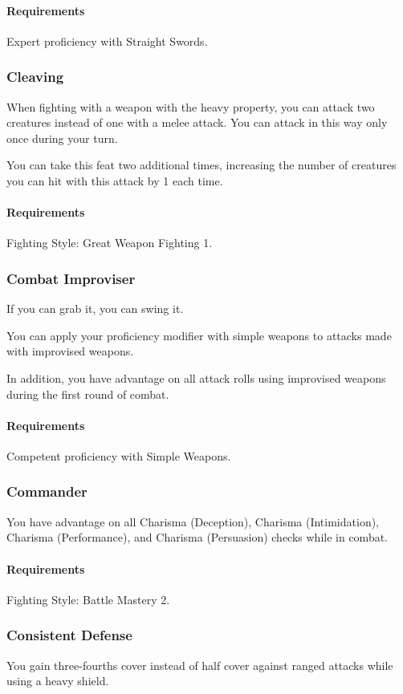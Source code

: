     \paragraph{Requirements} Expert proficiency with Straight Swords.
\subsubsection{Cleaving} \label{feat::cleaving}
    When fighting with a weapon with the heavy property, you can attack two creatures instead of one with a melee attack.
    You can attack in this way only once during your turn.

    You can take this feat two additional times, increasing the number of creatures you can hit with this attack by 1 each time.
    \paragraph{Requirements} Fighting Style: Great Weapon Fighting 1.
\subsubsection{Combat Improviser} \label{feat::combatimproviser}
    If you can grab it, you can swing it.

    You can apply your proficiency modifier with simple weapons to attacks made with improvised weapons.

    In addition, you have advantage on all attack rolls using improvised weapons during the first round of combat.
    \paragraph{Requirements} Competent proficiency with Simple Weapons.
\subsubsection{Commander} \label{feat::commander}
    You have advantage on all Charisma (Deception), Charisma (Intimidation), Charisma (Performance), and Charisma (Persuasion) checks while in combat.
    \paragraph{Requirements} Fighting Style: Battle Mastery 2.
\subsubsection{Consistent Defense} \label{feat::consistentdefense}
    You gain three-fourths cover instead of half cover against ranged attacks while using a heavy shield.
